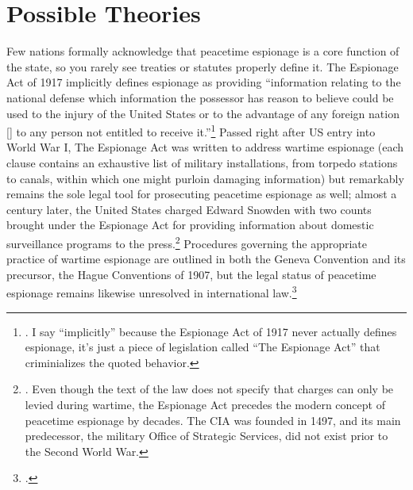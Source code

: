 \documentclass[12pt]{extarticle}
\begin{document}
\section{Possible Theories}
Few nations formally acknowledge that peacetime espionage is a core function of the state, so you rarely see treaties or statutes properly define it. The Espionage Act of 1917 implicitly defines espionage as providing \enquote{information relating to the national defense which information the possessor has reason to believe could be used to the injury of the United States or to the advantage of any foreign nation [\textellipsis] to any person not entitled to receive it.}\footnote{\cite{noauthor_notitle_nodate}. I say \enquote{implicitly} because the Espionage Act of 1917 never actually defines espionage, it's just a piece of legislation called \enquote{The Espionage Act} that criminializes the quoted behavior.} Passed right after US entry into World War I, The Espionage Act was written to address wartime espionage (each clause contains an exhaustive list of military installations, from torpedo stations to canals, within which one might purloin damaging information) but remarkably remains the sole legal tool for prosecuting peacetime espionage as well; almost a century later, the United States charged Edward Snowden with two counts brought under the Espionage Act for providing information about domestic surveillance programs to the press.\footnote{\cite{finn_us_2013}. Even though the text of the law does not specify that charges can only be levied during wartime, the Espionage Act precedes the modern concept of peacetime espionage by decades. The CIA was founded in 1497, and its main predecessor, the military Office of Strategic Services, did not exist prior to the Second World War.} Procedures governing the appropriate practice of wartime espionage are outlined in both the Geneva Convention and its precursor, the Hague Conventions of 1907, but the legal status of peacetime espionage remains likewise unresolved in international law.\footcite[651]{beim_enforcing_2018}
\end{document}
